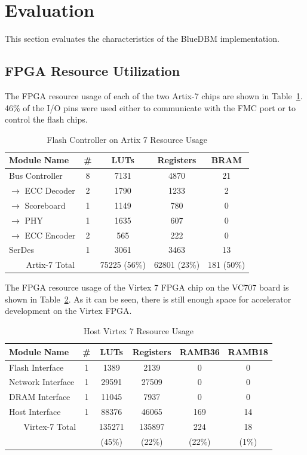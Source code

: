 \section{Evaluation}
\label{sec:results}

This section evaluates the characteristics of the BlueDBM implementation.

\subsection{FPGA Resource Utilization}

The FPGA resource usage of each of the two Artix-7 chips are shown in
Table~\ref{tab:artixutil}. 46\% of the I/O pins were used either to communicate
with the FMC port or to control the flash chips.

\begin{table}[h]\footnotesize
\centering
\begin{tabular}{l | c | c | c | c |}
Module Name & \# & LUTs & Registers & BRAM \\
\hline \hline
Bus Controller & 8 & 7131 & 4870 & 21 \\
$\rightarrow$ ECC Decoder & 2 & 1790 & 1233 & 2 \\
$\rightarrow$ Scoreboard & 1 & 1149 & 780 & 0 \\
$\rightarrow$ PHY & 1 & 1635 & 607 & 0 \\
$\rightarrow$ ECC Encoder & 2 & 565 & 222 & 0 \\
\hline
SerDes & 1 & 3061 & 3463 & 13 \\
\hline \hline
\multicolumn{2}{c}{
Artix-7 Total
} & 75225 (56\%) & 62801 (23\%) & 181 (50\%)
\end{tabular}
\caption{Flash Controller on Artix 7 Resource Usage}
\label{tab:artixutil}
\end{table}

The FPGA resource usage of the Virtex 7 FPGA chip on the VC707 board is shown in
Table~\ref{tab:virtexutil}. As it can be seen, there is still enough space for accelerator development on the Virtex FPGA.



\begin{table}[h]\footnotesize
\centering
\begin{tabular}{l | c | c | c | c | c |}
Module Name & \# & LUTs & Registers & RAMB36 & RAMB18 \\
\hline \hline
Flash Interface & 1 & 1389 & 2139 & 0 & 0 \\
Network Interface& 1 & 29591 & 27509 & 0 & 0\\
DRAM Interface& 1 & 11045 & 7937 & 0  & 0\\
Host Interface& 1 & 88376 & 46065 & 169 & 14 \\
\hline \hline
\multicolumn{2}{c}{
Virtex-7 Total
} & 135271& 135897 & 224 & 18 \\
\multicolumn{2}{c}{
} & (45\%) & (22\%) & (22\%) & (1\%)
\end{tabular}
\caption{Host Virtex 7 Resource Usage}
\label{tab:virtexutil}
\end{table}


